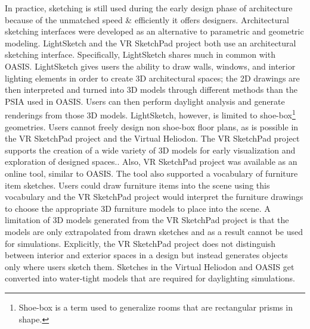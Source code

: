 	In practice, sketching is still used during the early design phase of architecture because of the unmatched speed \& efficiently it offers designers\cite{Galasiu}.
	Architectural sketching interfaces were developed as an alternative to parametric and geometric modeling.
	LightSketch and the VR SketchPad project both use an architectural sketching interface\cite{do2001vr,glaser2003sketch}.
	Specifically, LightSketch shares much in common with OASIS.
	LightSketch gives users the ability to draw walls, windows, and interior lighting elements in order to create 3D architectural spaces\cite{glaser2003sketch}; 
	the 2D drawings are then interpreted and turned into 3D models through different methods than the PSIA used in OASIS.
	Users can then perform daylight analysis and generate renderings from those 3D models.
	LightSketch, however, is limited to shoe-box\footnote{Shoe-box is a term used to generalize rooms that are rectangular prisms in shape.} geometries.
	Users cannot freely design non shoe-box floor plans, as is possible in the VR SketchPad project and the Virtual Heliodon.
	The VR SketchPad project supports the creation of a wide variety of 3D models for early visualization and exploration of designed spaces.\cite{do2001vr}.
	Also, VR SketchPad project was available as an online tool, similar to OASIS.
	The tool also supported a vocabulary of furniture item sketches.
	Users could draw furniture items into the scene using this vocabulary and the VR SketchPad project would interpret the furniture drawings to choose the appropriate 3D furniture models to place into the scene.
	A limitation of 3D models generated from the VR SketchPad project is that the models are only extrapolated from drawn sketches and as a result cannot be used for simulations.
	Explicitly, the VR SketchPad project does not distinguish between interior and exterior spaces in a design but instead generates objects only where users sketch them.
	Sketches in the Virtual Heliodon and OASIS get converted into water-tight models that are required for daylighting simulations.\\

